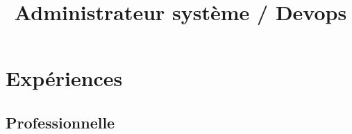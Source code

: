 \documentclass[10pt, a4paper]{moderncv}
\title{Administrateur système / Devops}
\begin{document}
\maketitle
\vspace*{-2.5\baselineskip}


\section{Expériences}

\subsection{Professionnelle}
\end{document}
